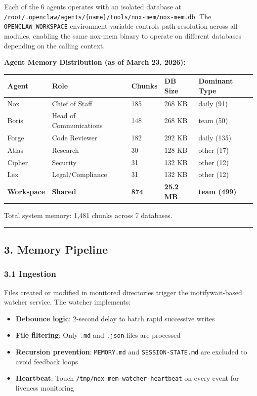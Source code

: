 \documentclass[
]{article}
\newcounter{none} %
\providecommand{\tightlist}{%
  \setlength{\itemsep}{0pt}\setlength{\parskip}{0pt}}
\begin{document}
Each of the 6 agents operates with an isolated database at
\texttt{/root/.openclaw/agents/\{name\}/tools/nox-mem/nox-mem.db}. The
\texttt{OPENCLAW\_WORKSPACE} environment variable controls path
resolution across all modules, enabling the same nox-mem binary to
operate on different databases depending on the calling context.

\textbf{Agent Memory Distribution (as of March 23, 2026):}

{\def\LTcaptype{none} %
\begin{longtable}[]{@{}lllll@{}}
\toprule\noalign{}
Agent & Role & Chunks & DB Size & Dominant Type \\
\midrule\noalign{}
\endhead
\bottomrule\noalign{}
\endlastfoot
Nox & Chief of Staff & 185 & 268 KB & daily (91) \\
Boris & Head of Communications & 148 & 268 KB & team (50) \\
Forge & Code Reviewer & 182 & 292 KB & daily (135) \\
Atlas & Research & 30 & 128 KB & other (17) \\
Cipher & Security & 31 & 132 KB & other (12) \\
Lex & Legal/Compliance & 31 & 132 KB & other (12) \\
\textbf{Workspace} & \textbf{Shared} & \textbf{874} & \textbf{25.2 MB} &
\textbf{team (499)} \\
\end{longtable}
}

Total system memory: 1,481 chunks across 7 databases.

\begin{center}\rule{0.5\linewidth}{0.5pt}\end{center}

\subsection{3. Memory Pipeline}\label{memory-pipeline}

\subsubsection{3.1 Ingestion}\label{ingestion}

Files created or modified in monitored directories trigger the
inotifywait-based watcher service. The watcher implements:

\begin{itemize}
\tightlist
\item
  \textbf{Debounce logic}: 2-second delay to batch rapid successive
  writes
\item
  \textbf{File filtering}: Only \texttt{.md} and \texttt{.json} files
  are processed
\item
  \textbf{Recursion prevention}: \texttt{MEMORY.md} and
  \texttt{SESSION-STATE.md} are excluded to avoid feedback loops
\item
  \textbf{Heartbeat}: Touch \texttt{/tmp/nox-mem-watcher-heartbeat} on
  every event for liveness monitoring
\end{itemize}
\end{document}
